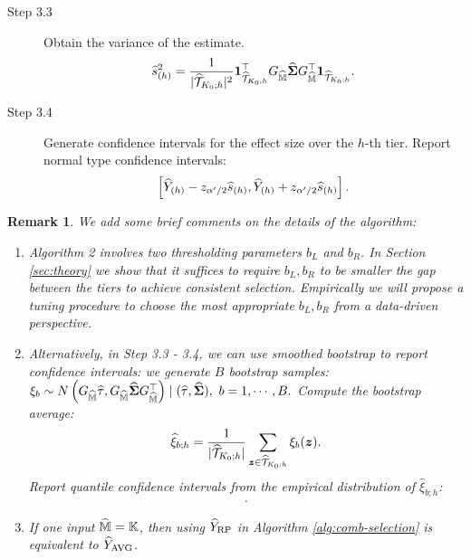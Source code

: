 \documentclass[12pt]{article}
\newtheorem{remark}{Remark}
\begin{document}
{\begin{description}
\begin{description}
\item[Step 3.3] Obtain the variance of the estimate. 
\begin{align*}
    \widehat{s}^2_{(h)} = \frac{1}{|\widehat{{\mathcal{T}}}_{K_0;h}|^2} {\boldsymbol{1}}_{\widehat{{\mathcal{T}}}_{K_0;h}}^\top G_{\widehat{{\mathbb{M}}}}\widehat{{\boldsymbol{\Sigma}}}G_{\widehat{{\mathbb{M}}}}^\top{\boldsymbol{1}}_{\widehat{{\mathcal{T}}}_{K_0;h}}.
\end{align*}

\item[Step 3.4] Generate confidence intervals for the effect size over the $h$-th tier. Report normal type confidence intervals:
\begin{align*}
    \left[\widehat{Y}_{(h)} - z_{{\alpha'}/{2}}\widehat{s}_{(h)}, \widehat{Y}_{(h)} + z_{{\alpha'}/{2}}\widehat{s}_{(h)}\right].
\end{align*}

\end{description}

\end{description}
}





\begin{remark} 
We add some brief comments on the details of the algorithm:
\begin{enumerate}
    \item Algorithm 2 involves two thresholding parameters $b_L$ and $b_R$. In Section \ref{sec:theory} we show that it suffices to require $b_L,b_R$ to be smaller the gap between the tiers to achieve consistent selection. Empirically we will propose a tuning procedure to choose the most appropriate $b_L,b_R$ from a data-driven perspective.
    \item Alternatively, in Step 3.3 - 3.4, we can use smoothed bootstrap to report confidence intervals: we generate $B$ bootstrap samples: $\xi_b\sim N\left(G_{\widehat{{\mathbb{M}}}}\widehat{\tau}, G_{\widehat{{\mathbb{M}}}}\widehat{{\boldsymbol{\Sigma}}}G_{\widehat{{\mathbb{M}}}}^\top\right)\mid(\widehat{\tau},\widehat{{\boldsymbol{\Sigma}}}), ~ b = 1,\cdots, B.$ Compute the bootstrap average: 
    $$
    \widehat{\xi}_{b;h} = \frac{1}{|\widehat{{\mathcal{T}}}_{K_0;h}|} \sum_{{\boldsymbol{z}}\in\widehat{{\mathcal{T}}}_{K_0;h}} \xi_{b}({\boldsymbol{z}}).
    $$
    Report quantile confidence intervals from the empirical distribution of $\hat{\xi}_{b;h}$:
    \begin{align*}
        [\hat{q}_{1-\alpha'/2}, \hat{q}_{\alpha'/2}].
    \end{align*} 
    \item If one input $\widehat{{\mathbb{M}}} = {\mathbb{K}}$, then using ${\widehat{Y}}_{\operatorname{RP}}$ in Algorithm \ref{alg:comb-selection} is equivalent to ${\widehat{Y}}_{\operatorname{AVG}}$. 
\end{enumerate}
\end{remark}
\end{document}

